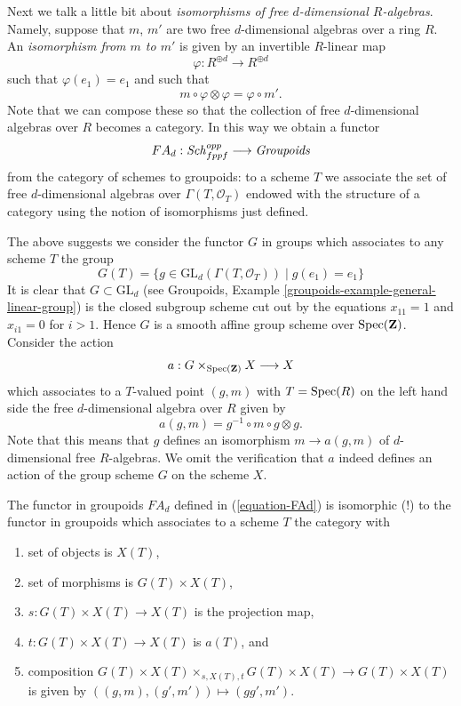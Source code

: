 \medskip\noindent
Next we talk a little bit about {\it isomorphisms of free $d$-dimensional
$R$-algebras}. Namely, suppose that $m$, $m'$ are two free $d$-dimensional
algebras over a ring $R$. An {\it isomorphism from $m$ to $m'$} is given by
an invertible $R$-linear map
$$
\varphi : R^{\oplus d} \longrightarrow R^{\oplus d}
$$
such that $\varphi(e_1) = e_1$ and such that
$$
m \circ \varphi \otimes \varphi = \varphi \circ m'.
$$
Note that we can compose these so that the collection of
free $d$-dimensional algebras over $R$ becomes a category.
In this way we obtain a functor
\begin{equation}
\label{equation-FAd}
FA_d : \mathit{Sch}_{fppf}^{opp} \longrightarrow \textit{Groupoids}
\end{equation}
from the category of schemes to groupoids: to a scheme $T$ we associate the
set of free $d$-dimensional algebras over $\Gamma(T, \mathcal{O}_T)$
endowed with the structure
of a category using the notion of isomorphisms just defined.

\medskip\noindent
The above suggests we consider the functor $G$ in groups
which associates to any scheme $T$ the group
$$
G(T) = \{g \in \text{GL}_d(\Gamma(T, \mathcal{O}_T)) \mid g(e_1) = e_1\}
$$
It is clear that $G \subset \text{GL}_d$ (see
Groupoids, Example \ref{groupoids-example-general-linear-group})
is the closed subgroup scheme cut out by the equations
$x_{11} = 1$ and $x_{i1} = 0$ for $i > 1$. Hence $G$ is a smooth
affine group scheme over $\mathop{\mathrm{Spec}}(\mathbf{Z})$. Consider the
action
$$
a : G \times_{\mathop{\mathrm{Spec}}(\mathbf{Z})} X \longrightarrow X
$$
which associates to a $T$-valued point $(g, m)$ with $T = \mathop{\mathrm{Spec}}(R)$
on the left hand side the free $d$-dimensional algebra over $R$
given by
$$
a(g, m) = g^{-1} \circ m \circ g \otimes g.
$$
Note that this means that $g$ defines an isomorphism $m \to a(g, m)$
of $d$-dimensional free $R$-algebras. We omit the verification that
$a$ indeed defines an action of the group scheme $G$ on the scheme $X$.

\begin{lemma}
\label{lemma-represent-FAd}
The functor in groupoids $FA_d$ defined in (\ref{equation-FAd})
is isomorphic (!) to the functor in groupoids which associates
to a scheme $T$ the category with
\begin{enumerate}
\item set of objects is $X(T)$,
\item set of morphisms is $G(T) \times X(T)$,
\item $s : G(T) \times X(T) \to X(T)$ is the projection map,
\item $t : G(T) \times X(T) \to X(T)$ is $a(T)$, and
\item composition $G(T) \times X(T) \times_{s, X(T), t} G(T) \times X(T)
\to G(T) \times X(T)$ is given by $((g, m), (g', m')) \mapsto (gg', m')$.
\end{enumerate}
\end{lemma}

